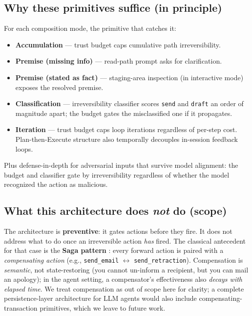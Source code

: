 \documentclass[11pt]{article}
\begin{document}
\subsection{Why these primitives suffice (in principle)}

For each composition mode, the primitive that catches it:
\begin{itemize}[leftmargin=*]
\item \textbf{Accumulation} --- trust budget caps cumulative path irreversibility.
\item \textbf{Premise (missing info)} --- read-path prompt asks for clarification.
\item \textbf{Premise (stated as fact)} --- staging-area inspection (in interactive mode) exposes the resolved premise.
\item \textbf{Classification} --- irreversibility classifier scores \texttt{send} and \texttt{draft} an order of magnitude apart; the budget gates the misclassified one if it propagates.
\item \textbf{Iteration} --- trust budget caps loop iterations regardless of per-step cost. Plan-then-Execute structure also temporally decouples in-session feedback loops.
\end{itemize}

Plus defense-in-depth for adversarial inputs that survive model alignment: the budget and classifier gate by irreversibility regardless of whether the model recognized the action as malicious.

\subsection{What this architecture does \emph{not} do (scope)}

The architecture is \textbf{preventive}: it gates actions before they fire. It does not address what to do once an irreversible action \emph{has} fired. The classical antecedent for that case is the \textbf{Saga pattern} \citep{garcia1987sagas}: every forward action is paired with a \emph{compensating action} (e.g., \texttt{send\_email} $\leftrightarrow$ \texttt{send\_retraction}). Compensation is \emph{semantic}, not state-restoring (you cannot un-inform a recipient, but you can mail an apology); in the agent setting, a compensator's effectiveness also \emph{decays with elapsed time}. We treat compensation as out of scope here for clarity; a complete persistence-layer architecture for LLM agents would also include compensating-transaction primitives, which we leave to future work.
\end{document}
